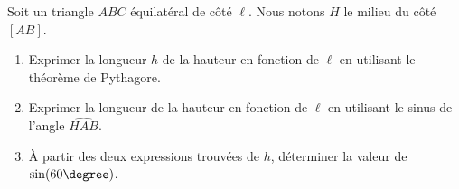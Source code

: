 
\begin{exercice}\label{exosmath-0444}

    Soit un triangle \( ABC\) équilatéral de côté \( \ell\). Nous notons \( H\) le milieu du côté \( [AB]\).
    \begin{enumerate}
        \item
            Exprimer la longueur \( h\) de la hauteur en fonction de \( \ell\) en utilisant le théorème de Pythagore.
        \item
            Exprimer la longueur de la hauteur en fonction de \( \ell\) en utilisant le sinus de l'angle \( \widehat{HAB}\).
        \item
            À partir des deux expressions trouvées de \( h\), déterminer la valeur de \( \sin(60\degree)\).
    \end{enumerate}

\end{exercice}
